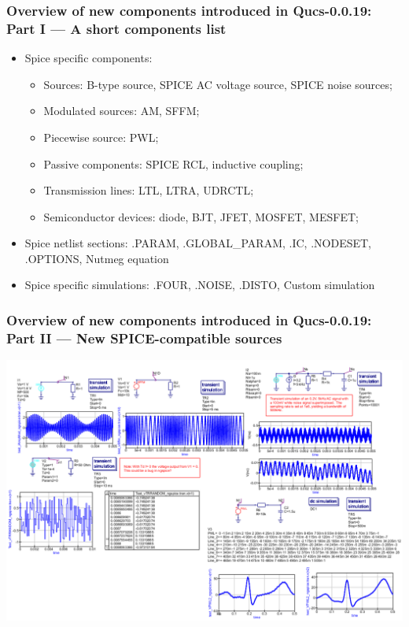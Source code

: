\documentclass[9pt]{beamer}
\begin{document}
\begin{frame}
 \frametitle{Overview of new components introduced in Qucs-0.0.19: Part I --- A 
short components list}

\begin{itemize}
 \item Spice specific components:
 \begin{itemize}
 \item Sources: B-type source, SPICE AC voltage source, SPICE noise sources;
 \item Modulated sources: AM, SFFM; 
 \item Piecewise source: PWL;
 \item Passive components: SPICE RCL, inductive coupling;
 \item Transmission lines: LTL, LTRA, UDRCTL;
 \item Semiconductor devices: diode, BJT, JFET, MOSFET, MESFET;
\end{itemize}
\item Spice netlist sections: .PARAM, .GLOBAL\_PARAM, .IC, .NODESET, .OPTIONS, 
Nutmeg equation
\item Spice specific simulations: .FOUR, .NOISE, .DISTO, Custom simulation
\end{itemize}


\end{frame}


\begin{frame}
  \frametitle{Overview of new components introduced in Qucs-0.0.19: \\ Part II 
--- New SPICE-compatible sources}

\includegraphics[width=\textwidth]{img/new_srcs.png}

\end{frame}
\end{document}
